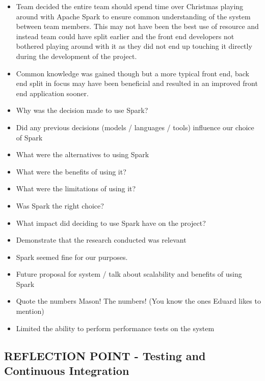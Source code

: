 \documentclass{l3proj}
\begin{document}


\begin{itemize}
\item Team decided the entire team should spend time over Christmas playing around with Apache Spark to ensure common understanding of the system between team members. This may not have been the best use of resource and instead team could have split earlier and the front end developers not bothered playing around with it as they did not end up touching it directly during the development of the project. 
\item Common knowledge was gained though but a more typical front end, back end split in focus may have been beneficial and resulted in an improved front end application sooner.
\item Why was the decision made to use Spark?
\item Did any previous decisions (models / languages / tools) influence our choice of Spark
\item What were the alternatives to using Spark
\item What were the benefits of using it?
\item What were the limitations of using it?
\item Was Spark the right choice?
\item What impact did deciding to use Spark have on the project?
\item Demonstrate that the research conducted was relevant
\item Spark seemed fine for our purposes.
\item Future proposal for system / talk about scalability and benefits of using Spark
\item Quote the numbers Mason! The numbers! (You know the ones Eduard likes to mention)
\item Limited the ability to perform performance tests on the system
\end{itemize}


\subsection{REFLECTION POINT - Testing and Continuous Integration}
\label{sec:testing}
\end{document}

